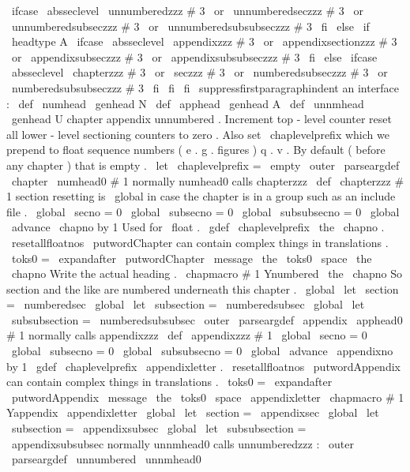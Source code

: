 {{{{%
\
ifcase
\
absseclevel
\
unnumberedzzz
{
#
3
}
%
\
or
\
unnumberedseczzz
{
#
3
}
%
\
or
\
unnumberedsubseczzz
{
#
3
}
%
\
or
\
unnumberedsubsubseczzz
{
#
3
}
%
\
fi
\
else
\
if
\
headtype
A
%
\
ifcase
\
absseclevel
\
appendixzzz
{
#
3
}
%
\
or
\
appendixsectionzzz
{
#
3
}
%
\
or
\
appendixsubseczzz
{
#
3
}
%
\
or
\
appendixsubsubseczzz
{
#
3
}
%
\
fi
\
else
\
ifcase
\
absseclevel
\
chapterzzz
{
#
3
}
%
\
or
\
seczzz
{
#
3
}
%
\
or
\
numberedsubseczzz
{
#
3
}
%
\
or
\
numberedsubsubseczzz
{
#
3
}
%
\
fi
\
fi
\
fi
\
suppressfirstparagraphindent
}
%
an
interface
:
\
def
\
numhead
{
\
genhead
N
}
\
def
\
apphead
{
\
genhead
A
}
\
def
\
unnmhead
{
\
genhead
U
}
%
chapter
appendix
unnumbered
.
Increment
top
-
level
counter
reset
%
all
lower
-
level
sectioning
counters
to
zero
.
%
%
Also
set
\
chaplevelprefix
which
we
prepend
to
float
sequence
numbers
%
(
e
.
g
.
figures
)
q
.
v
.
By
default
(
before
any
chapter
)
that
is
empty
.
\
let
\
chaplevelprefix
=
\
empty
%
\
outer
\
parseargdef
\
chapter
{
\
numhead0
{
#
1
}
}
%
normally
numhead0
calls
chapterzzz
\
def
\
chapterzzz
#
1
{
%
%
section
resetting
is
\
global
in
case
the
chapter
is
in
a
group
such
%
as
an
include
file
.
\
global
\
secno
=
0
\
global
\
subsecno
=
0
\
global
\
subsubsecno
=
0
\
global
\
advance
\
chapno
by
1
%
%
Used
for
\
float
.
\
gdef
\
chaplevelprefix
{
\
the
\
chapno
.
}
%
\
resetallfloatnos
%
%
\
putwordChapter
can
contain
complex
things
in
translations
.
\
toks0
=
\
expandafter
{
\
putwordChapter
}
%
\
message
{
\
the
\
toks0
\
space
\
the
\
chapno
}
%
%
%
Write
the
actual
heading
.
\
chapmacro
{
#
1
}
{
Ynumbered
}
{
\
the
\
chapno
}
%
%
%
So
section
and
the
like
are
numbered
underneath
this
chapter
.
\
global
\
let
\
section
=
\
numberedsec
\
global
\
let
\
subsection
=
\
numberedsubsec
\
global
\
let
\
subsubsection
=
\
numberedsubsubsec
}
\
outer
\
parseargdef
\
appendix
{
\
apphead0
{
#
1
}
}
%
normally
calls
appendixzzz
%
\
def
\
appendixzzz
#
1
{
%
\
global
\
secno
=
0
\
global
\
subsecno
=
0
\
global
\
subsubsecno
=
0
\
global
\
advance
\
appendixno
by
1
\
gdef
\
chaplevelprefix
{
\
appendixletter
.
}
%
\
resetallfloatnos
%
%
\
putwordAppendix
can
contain
complex
things
in
translations
.
\
toks0
=
\
expandafter
{
\
putwordAppendix
}
%
\
message
{
\
the
\
toks0
\
space
\
appendixletter
}
%
%
\
chapmacro
{
#
1
}
{
Yappendix
}
{
\
appendixletter
}
%
%
\
global
\
let
\
section
=
\
appendixsec
\
global
\
let
\
subsection
=
\
appendixsubsec
\
global
\
let
\
subsubsection
=
\
appendixsubsubsec
}
%
normally
unnmhead0
calls
unnumberedzzz
:
\
outer
\
parseargdef
\
unnumbered
{
\
unnmhead0
}}}}

